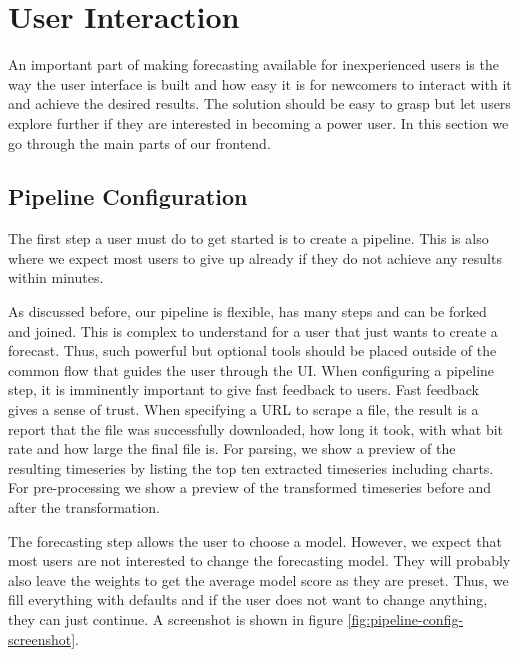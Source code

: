 \section{User Interaction}

An important part of making forecasting available for inexperienced users is the way the user interface is built and how easy it is for newcomers to interact with it and achieve the desired results. The solution should be easy to grasp but let users explore further if they are interested in becoming a power user. In this section we go through the main parts of our frontend.

\subsection{Pipeline Configuration}

The first step a user must do to get started is to create a pipeline. This is also where we expect most users to give up already if they do not achieve any results within minutes.

As discussed before, our pipeline is flexible, has many steps and can be forked and joined. This is complex to understand for a user that just wants to create a forecast. Thus, such powerful but optional tools should be placed outside of the common flow that guides the user through the UI.
When configuring a pipeline step, it is imminently important to give fast feedback to users. Fast feedback gives a sense of trust. When specifying a URL to scrape a file, the result is a report that the file was successfully downloaded, how long it took, with what bit rate and how large the final file is. For parsing, we show a preview of the resulting timeseries by listing the top ten extracted timeseries including charts. For pre-processing we show a preview of the transformed timeseries before and after the transformation.

The forecasting step allows the user to choose a model. However, we expect that most users are not interested to change the forecasting model. They will probably also leave the weights to get the average model score as they are preset. Thus, we fill everything with defaults and if the user does not want to change anything, they can just continue. A screenshot is shown in figure \ref{fig:pipeline-config-screenshot}.


